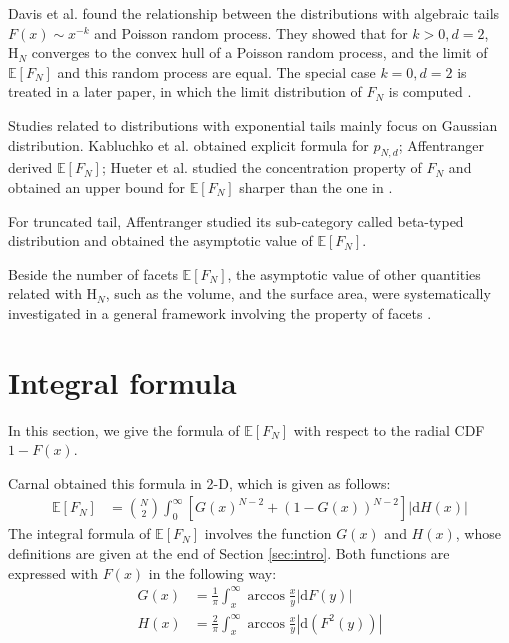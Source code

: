 \documentclass{aptpub}
\def\E{\mathbb{E}}
\begin{document}
Davis et al. \cite{davis1987convex} found the relationship between the distributions with algebraic tails $F(x) \sim x^{-k}$ and Poisson random process.
They showed that for $k>0, d=2$,
$\mathrm{H}_N$ converges to the convex hull of a Poisson random process,
and
the limit of $\E[F_N]$ and this random process are equal.
The special case $k=0, d=2$ is treated in a later paper, in which the
limit distribution of $F_N$ is computed \cite{aldous1991number}.

Studies related to distributions with exponential tails mainly focus on Gaussian distribution.
Kabluchko et al. \cite{kabluchko2020absorption} obtained explicit formula for $p_{N,d}$;
Affentranger \cite{affentranger1991convex} derived $\E[F_N]$;
Hueter et al. \cite{hueter1999limit} studied the concentration property of $F_N$ and obtained
an upper bound for $\E[F_N]$ sharper than the one in \cite{dwyer1991convex}.

For truncated tail,
Affentranger \cite{affentranger1991convex} studied its sub-category called beta-typed distribution and obtained
the asymptotic value of $\E[F_N]$.

Beside the number of facets $\E[F_N]$,
the asymptotic value of other quantities related with $\mathrm{H}_N$, such as the volume, and the surface area,
were systematically investigated in a general framework involving the property of facets
\cite{schneider2008stochastic, barany2008random}.

 \section{Integral formula}\label{sec:int_f}
In this section, we give the formula of $\E[F_N]$ with respect to the radial CDF $1-F(x)$.

Carnal \cite{carnal1970konvexe}
obtained
this formula in 2-D, which is given as follows:
\begin{align}
     \E[F_N] &= \binom{N}{2} \int_0^{\infty} 
     \left[G(x)^{N-2} + (1-G(x))^{N-2} \right]|\mathrm{d} H(x)| 
     \label{eq:E_F_N_2_d}
\end{align}
The integral formula of $\E[F_N]$ involves the function $G(x)$ and $H(x)$,
whose definitions are given at the end of Section \ref{sec:intro}.
Both functions are expressed with $F(x)$ in the following way:
\begin{align}
   G(x) &=\frac{1}{\pi} \int_x^{\infty}\arccos\frac{x}{y} |\mathrm{d} F(y)| \\
     H(x) &= \frac{2}{\pi} \int_x^{\infty} \arccos \frac{x}{y} |\mathrm{d}(F^2(y))|
     \label{eq:H_expression_2_dim}
\end{align}
\end{document}
